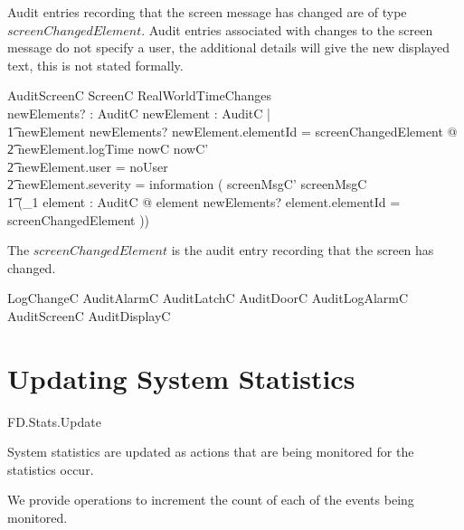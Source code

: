 Audit entries recording that the screen message has changed are of type  $screenChangedElement$.
Audit entries associated with changes to the screen message do not specify a
user, the additional details will give the new displayed text, this is
not stated formally.

\begin{schema}{AuditScreenC}
        \Delta ScreenC
\also
        RealWorldTimeChanges
\\      newElements? : \finset AuditC
\where
        \forall  newElement : AuditC | 
\\ \t1  newElement \in newElements?
        \land newElement.elementId = screenChangedElement  @ 
\\ \t2        newElement.logTime \in nowC \upto nowC'
\\ \t2  \land newElement.user = noUser
\\ \t2  \land newElement.severity = information
\also
      ( screenMsgC' \neq screenMsgC  
\\      \t1             \iff (\exists_1 element : AuditC @ element \in  newElements? \land
element.elementId = screenChangedElement ))
\end{schema}
\begin{Zcomment}
\item
The $screenChangedElement$ is the audit entry recording that the
screen has changed.
\end{Zcomment}

\begin{zed}
        LogChangeC  AuditAlarmC \land AuditLatchC \land AuditDoorC
        \land AuditLogAlarmC \land AuditScreenC \land AuditDisplayC 
\end{zed}
\section{Updating System Statistics}

\begin{traceunit}{FD.Stats.Update}
\end{traceunit}

System statistics are updated as actions that are being monitored for
the statistics occur.

We provide operations to increment the count of each of the events
being monitored.

